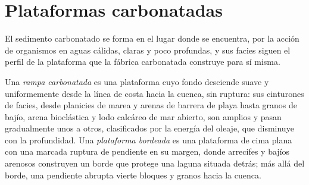 \begin{omfigure}
\par{}\label{fig:b3:facies-models:deep}
\end{omfigure}

\section{Plataformas carbonatadas}\label{sec:b3:facies-models:carbonates}

El sedimento carbonatado se forma en el lugar donde se encuentra, por la acción de organismos en aguas cálidas, claras
y poco profundas, y sus facies siguen el perfil de la plataforma que la
fábrica carbonatada construye para sí misma.

\begin{definition}\label{def:b3:facies-models:ramp}
Una \emph{rampa carbonatada} es una plataforma cuyo fondo
desciende suave y uniformemente desde la línea de costa hacia la cuenca, sin ruptura:
sus cinturones de facies, desde planicies de marea y arenas de barrera de playa hasta granos de bajío,
arena bioclástica y lodo calcáreo de mar abierto, son amplios y pasan gradualmente unos a otros,
clasificados por la energía del oleaje, que disminuye con la profundidad. Una \emph{plataforma
bordeada} es una plataforma de cima plana con una marcada ruptura
de pendiente en su margen, donde arrecifes y bajíos arenosos construyen un borde que protege
una laguna situada detrás; más allá del borde, una pendiente abrupta vierte bloques y granos
hacia la cuenca.
\end{definition}

